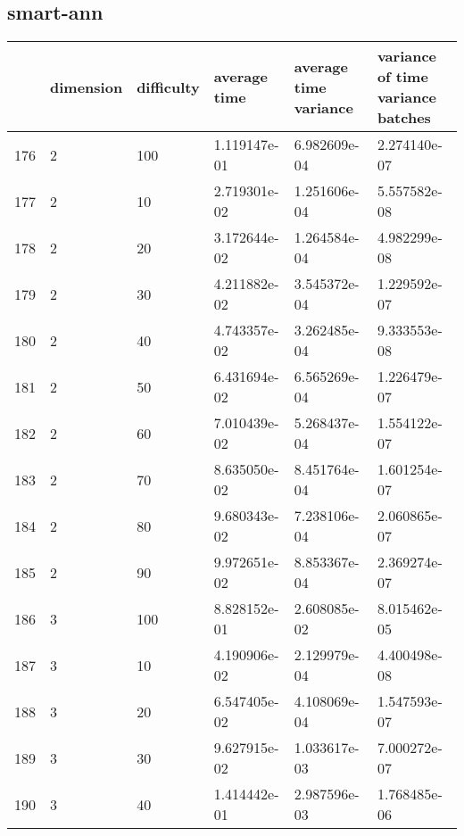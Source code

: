 \documentclass{article}
\begin{document}
\subsection{smart-ann}
\begin{center}
\begin{tabular}{llllll}
\toprule
{} & dimension & difficulty &  average time & average time variance & variance of time variance batches \\
\midrule
176 &         2 &        100 &  1.119147e-01 &          6.982609e-04 &                      2.274140e-07 \\
177 &         2 &         10 &  2.719301e-02 &          1.251606e-04 &                      5.557582e-08 \\
178 &         2 &         20 &  3.172644e-02 &          1.264584e-04 &                      4.982299e-08 \\
179 &         2 &         30 &  4.211882e-02 &          3.545372e-04 &                      1.229592e-07 \\
180 &         2 &         40 &  4.743357e-02 &          3.262485e-04 &                      9.333553e-08 \\
181 &         2 &         50 &  6.431694e-02 &          6.565269e-04 &                      1.226479e-07 \\
182 &         2 &         60 &  7.010439e-02 &          5.268437e-04 &                      1.554122e-07 \\
183 &         2 &         70 &  8.635050e-02 &          8.451764e-04 &                      1.601254e-07 \\
184 &         2 &         80 &  9.680343e-02 &          7.238106e-04 &                      2.060865e-07 \\
185 &         2 &         90 &  9.972651e-02 &          8.853367e-04 &                      2.369274e-07 \\
186 &         3 &        100 &  8.828152e-01 &          2.608085e-02 &                      8.015462e-05 \\
187 &         3 &         10 &  4.190906e-02 &          2.129979e-04 &                      4.400498e-08 \\
188 &         3 &         20 &  6.547405e-02 &          4.108069e-04 &                      1.547593e-07 \\
189 &         3 &         30 &  9.627915e-02 &          1.033617e-03 &                      7.000272e-07 \\
190 &         3 &         40 &  1.414442e-01 &          2.987596e-03 &                      1.768485e-06 \\

\end{tabular}
\end{center}
\end{document}
